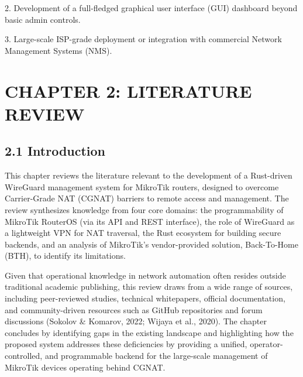 \documentclass[12pt,a4paper,oneside]{report}
\begin{document}
2. Development of a full-fledged graphical user interface (GUI) dashboard beyond basic admin controls.


3. Large-scale ISP-grade deployment or integration with commercial Network Management Systems (NMS).
















































\chapter{CHAPTER 2: LITERATURE REVIEW}

\section{2.1 Introduction}

This chapter reviews the literature relevant to the development of a Rust-driven WireGuard management system for MikroTik routers, designed to overcome Carrier-Grade NAT (CGNAT) barriers to remote access and management. The review synthesizes knowledge from four core domains: the programmability of MikroTik RouterOS (via its API and REST interface), the role of WireGuard as a lightweight VPN for NAT traversal, the Rust ecosystem for building secure backends, and an analysis of MikroTik's vendor-provided solution, Back-To-Home (BTH), to identify its limitations.




Given that operational knowledge in network automation often resides outside traditional academic publishing, this review draws from a wide range of sources, including peer-reviewed studies, technical whitepapers, official documentation, and community-driven resources such as GitHub repositories and forum discussions (Sokolov \& Komarov, 2022; Wijaya et al., 2020). The chapter concludes by identifying gaps in the existing landscape and highlighting how the proposed system addresses these deficiencies by providing a unified, operator-controlled, and programmable backend for the large-scale management of MikroTik devices operating behind CGNAT.
\end{document}
